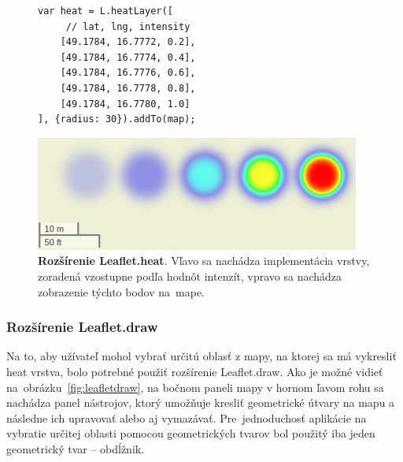 \begin{figure}[ht]
\begin{minipage}{.5\textwidth}
\begin{lstlisting}
var heat = L.heatLayer([
     // lat, lng, intensity
    [49.1784, 16.7772, 0.2],
    [49.1784, 16.7774, 0.4],
    [49.1784, 16.7776, 0.6],
    [49.1784, 16.7778, 0.8],
    [49.1784, 16.7780, 1.0]
], {radius: 30}).addTo(map);
\end{lstlisting}
\end{minipage}
\hfill
\begin{minipage}{.5\linewidth}
    \centering
    \includegraphics[width=0.7\linewidth]{obrazky-figures/heatlayer-screenshot.png}
\end{minipage}
\caption{\textbf{Rozšírenie Leaflet.heat}. Vľavo sa nachádza implementácia vrstvy, zoradená vzostupne podľa hodnôt intenzít, vpravo sa nachádza zobrazenie týchto bodov na~mape.}
\label{fig:leafletheat}
\end{figure}

\subsubsection{Rozšírenie Leaflet.draw}
Na to, aby užívateľ mohol vybrať určitú oblasť z mapy, na ktorej sa má vykresliť heat vrstva, bolo potrebné použiť rozšírenie Leaflet.draw. Ako je možné vidieť na~obrázku~\ref{fig:leafletdraw}, na bočnom paneli mapy v hornom ľavom rohu sa nachádza panel nástrojov, ktorý umožňuje kresliť geometrické útvary na mapu a následne ich upravovať alebo aj vymazávať. Pre~jednoduchosť aplikácie na vybratie určitej oblasti pomocou geometrických tvarov bol použitý iba jeden geometrický tvar \--- obdĺžnik.

